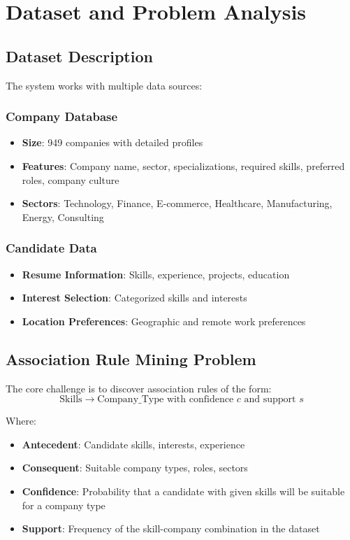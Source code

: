 \documentclass[12pt,a4paper]{article}
\begin{document}
\section{Dataset and Problem Analysis}

\subsection{Dataset Description}
The system works with multiple data sources:

\subsubsection{Company Database}
\begin{itemize}
    \item \textbf{Size}: 949 companies with detailed profiles
    \item \textbf{Features}: Company name, sector, specializations, required skills, preferred roles, company culture
    \item \textbf{Sectors}: Technology, Finance, E-commerce, Healthcare, Manufacturing, Energy, Consulting
\end{itemize}

\subsubsection{Candidate Data}
\begin{itemize}
    \item \textbf{Resume Information}: Skills, experience, projects, education
    \item \textbf{Interest Selection}: Categorized skills and interests
    \item \textbf{Location Preferences}: Geographic and remote work preferences
\end{itemize}

\subsection{Association Rule Mining Problem}
The core challenge is to discover association rules of the form:
\begin{equation}
\text{Skills} \rightarrow \text{Company\_Type} \text{ with confidence } c \text{ and support } s
\end{equation}

Where:
\begin{itemize}
    \item \textbf{Antecedent}: Candidate skills, interests, experience
    \item \textbf{Consequent}: Suitable company types, roles, sectors
    \item \textbf{Confidence}: Probability that a candidate with given skills will be suitable for a company type
    \item \textbf{Support}: Frequency of the skill-company combination in the dataset
\end{itemize}
\end{document}
